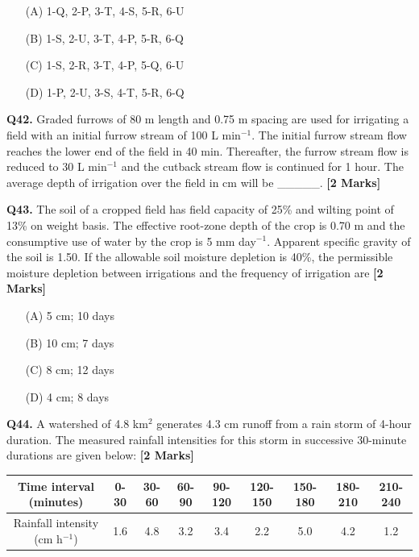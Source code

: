 \documentclass[11pt]{article}
\newcommand{\questionb}[2]{
    \noindent\textbf{Q#2.} #1 \hfill \textbf{[2 Marks]}
}
\begin{document}
\begin{enumerate}
    \item[(A)] 1-Q, 2-P, 3-T, 4-S, 5-R, 6-U
    \item[(B)] 1-S, 2-U, 3-T, 4-P, 5-R, 6-Q
    \item[(C)] 1-S, 2-R, 3-T, 4-P, 5-Q, 6-U
    \item[(D)] 1-P, 2-U, 3-S, 4-T, 5-R, 6-Q
\end{enumerate}

\vspace{0.5cm}

\questionb{Graded furrows of 80 m length and 0.75 m spacing are used for irrigating a field with an initial furrow stream of 100 L min$^{-1}$. The initial furrow stream flow reaches the lower end of the field in 40 min. Thereafter, the furrow stream flow is reduced to 30 L min$^{-1}$ and the cutback stream flow is continued for 1 hour. The average depth of irrigation over the field in cm will be \_\_\_\_\_.}{42}

\vspace{0.5cm}

\questionb{The soil of a cropped field has field capacity of 25\% and wilting point of 13\% on weight basis. The effective root-zone depth of the crop is 0.70 m and the consumptive use of water by the crop is 5 mm day$^{-1}$. Apparent specific gravity of the soil is 1.50. If the allowable soil moisture depletion is 40\%, the permissible moisture depletion between irrigations and the frequency of irrigation are}{43}
\begin{enumerate}
    \item[(A)] 5 cm; 10 days
    \item[(B)] 10 cm; 7 days
    \item[(C)] 8 cm; 12 days
    \item[(D)] 4 cm; 8 days
\end{enumerate}

\vspace{0.5cm}

\questionb{A watershed of 4.8 km$^2$ generates 4.3 cm runoff from a rain storm of 4-hour duration. The measured rainfall intensities for this storm in successive 30-minute durations are given below:}{44}

\begin{center}
\begin{tabular}{|c|c|c|c|c|c|c|c|c|}
\hline
Time interval (minutes) & 0-30 & 30-60 & 60-90 & 90-120 & 120-150 & 150-180 & 180-210 & 210-240 \\
\hline
Rainfall intensity (cm h$^{-1}$) & 1.6 & 4.8 & 3.2 & 3.4 & 2.2 & 5.0 & 4.2 & 1.2 \\
\hline
\end{tabular}
\end{center}
\end{document}
